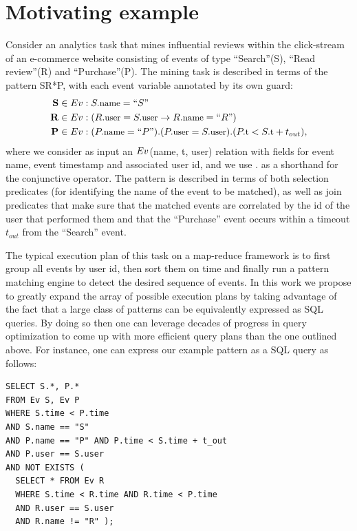 
\section{Motivating example}
\label{sec:mot_example}

Consider an analytics task that mines influential reviews
within the click-stream of an e-commerce website consisting of events of type
``Search''(S), ``Read review''(R) and ``Purchase''(P).
The mining task is described in terms of the pattern SR*P, with each event 
variable annotated by its own guard:
\begin{align*}
\text{{\bf S}} \in \Ev&: \facc{S}{name} = ``S"
\\
\text{{\bf R}} \in \Ev&: (\facc{R}{user} = \facc{S}{user} \rightarrow
                          \facc{R}{name} = ``R")
\\
\text{{\bf P}} \in \Ev&: (\facc{P}{name} = ``P") . 
                         (\facc{P}{user} = \facc{S}{user}) . 
                         (\facc{P}{t} < \facc{S}{t} + t_{out}),
\end{align*}
where we consider as input an $Ev$(name, t, user) relation with fields for 
event name, event timestamp and associated user id, and we use $.$ as a 
shorthand for the conjunctive operator. 
The pattern is described in terms of both selection predicates (for identifying 
the name of the event to be matched), as well as join predicates that make sure 
that the matched events are correlated by the id of the user that performed 
them and that the ``Purchase'' event occurs within a timeout $t_{out}$ from the 
``Search'' event. 

The typical execution plan of this task on a map-reduce framework is to first
group all events by user id, then sort them on time and finally run a pattern
matching engine to detect the desired sequence of events.
In this work we propose to greatly expand the array of possible execution plans
by taking advantage of the fact that a large class of patterns can be
equivalently expressed as SQL queries.
By doing so then one can leverage decades of progress in query optimization to
come up with more efficient query plans than the one outlined above.
For instance, one can express our example pattern as a SQL query as follows:
{\small
\begin{verbatim}
SELECT S.*, P.*
FROM Ev S, Ev P
WHERE S.time < P.time
AND S.name == "S"   
AND P.name == "P" AND P.time < S.time + t_out
AND P.user == S.user
AND NOT EXISTS ( 
  SELECT * FROM Ev R
  WHERE S.time < R.time AND R.time < P.time
  AND R.user == S.user
  AND R.name != "R" ); 
\end{verbatim}
}

